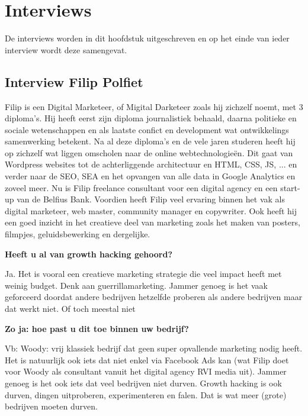 
\chapter{Interviews}
\label{ch:interviews}

De interviews worden in dit hoofdstuk uitgeschreven en op het einde van ieder interview wordt deze samengevat.

\section{Interview Filip Polfiet}
\label{sec:interview-filip}

Filip is een Digital Marketeer, of Migital Darketeer zoals hij zichzelf noemt, met 3 diploma's. Hij heeft eerst zijn diploma journalistiek behaald, daarna politieke en sociale wetenschappen en als laatste confict en development wat ontwikkelings samenwerking betekent. Na al deze diploma's en de vele jaren studeren heeft hij op zichzelf wat liggen omscholen naar de online webtechnologieën. Dit gaat van Wordpress websites tot de achterliggende architectuur en HTML, CSS, JS, ... en verder naar de SEO, SEA en het opvangen van alle data in Google Analytics en zoveel meer. Nu is Filip freelance consultant voor een digital agency en een start-up van de Belfius Bank. Voordien heeft Filip veel ervaring binnen het vak als digital marketeer, web master, community manager en copywriter. Ook heeft hij een goed inzicht in het creatieve deel van marketing zoals het maken van posters, filmpjes, geluidsbewerking en dergelijke.

\textbf{Heeft u al van growth hacking gehoord?}
	
Ja. Het is vooral een creatieve marketing strategie die veel impact heeft met weinig budget. Denk aan guerrillamarketing. Jammer genoeg is het vaak geforceerd doordat andere bedrijven hetzelfde proberen als andere bedrijven maar dat werkt niet. Of toch meestal niet

\textbf{Zo ja: hoe past u dit toe binnen uw bedrijf?}
	
Vb: Woody: vrij klassiek bedrijf dat geen super opvallende marketing nodig heeft. Het is natuurlijk ook iets dat niet enkel via Facebook Ads kan (wat Filip doet voor Woody als consultant vanuit het digital agency RVI media uit). Jammer genoeg is het ook iets dat veel bedrijven niet durven. Growth hacking is ook durven, dingen uitproberen, experimenteren en falen. Dat is wat meer (grote) bedrijven moeten durven.
	
